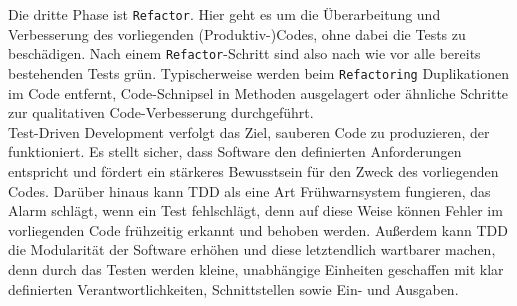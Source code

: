 \pagebreak

Die dritte Phase ist \texttt{Refactor}. Hier geht es um die Überarbeitung und 
Verbesserung des vorliegenden (Produktiv-)Codes, ohne dabei die Tests zu beschädigen. 
Nach einem \texttt{Refactor}-Schritt sind also nach wie vor alle bereits bestehenden 
Tests grün. Typischerweise werden beim \texttt{Refactoring} Duplikationen 
im Code entfernt, Code-Schnipsel in Methoden ausgelagert oder ähnliche Schritte zur 
qualitativen Code-Verbesserung durchgeführt. \\ 
Test-Driven Development verfolgt das Ziel, sauberen Code zu produzieren, der 
funktioniert. Es stellt sicher, dass Software den definierten Anforderungen entspricht 
und fördert ein stärkeres Bewusstsein für den Zweck des vorliegenden Codes. Darüber 
hinaus kann TDD als eine Art Frühwarnsystem fungieren, das Alarm schlägt, wenn ein 
Test fehlschlägt, denn auf diese Weise können Fehler im vorliegenden Code frühzeitig 
erkannt und behoben werden. Außerdem kann TDD die Modularität der Software erhöhen und 
diese letztendlich wartbarer machen, denn durch das Testen werden kleine, unabhängige 
Einheiten geschaffen mit klar definierten Verantwortlichkeiten, Schnittstellen sowie 
Ein- und Ausgaben. 

